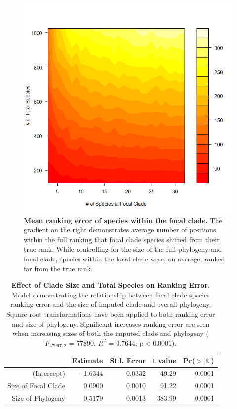 \documentclass[12pt,english]{article}
\begin{document}
\begin{figure}[!ht]
  \center
  \includegraphics[width=.5\textwidth]{rankingError.png}
  \caption{\textbf{Mean ranking error of species within the focal clade.} The 
  gradient on the right demonstrates average number of positions within the 
  full ranking that focal clade species shifted from their true rank.
  While controlling for the size of the full phylogeny and focal clade, species 
  within the focal clade were, on average, ranked far from the true rank. }
  \label{rankingError}
\end{figure}

\begin{table}[ht]
  \centering
  \begin{tabular}{rrrrr}
    \hline
   & Estimate & Std. Error & t value & Pr($>$$|$t$|$) \\
    \hline
  (Intercept) & -1.6344 & 0.0332 & -49.29 & 0.0001 \\
    Size of Focal Clade & 0.0900 & 0.0010 & 91.22 & 0.0001 \\
    Size of Phylogeny & 0.5179 & 0.0013 & 383.99 & 0.0001 \\
     \hline
     \hline
  \end{tabular}
  \caption{\textbf{Effect of Clade Size and Total Species on Ranking
  Error.} Model demonstrating the relationship between focal clade species
  ranking error and the size of imputed clade and overall phylogeny. Square-root
  transformations have been applied to both ranking error and size of phylogeny.
  Significant increases ranking error are seen when increasing sizes of both the
  imputed clade and phylogeny ($F_{47997, 2}$ = 77890, $R^{2}$ = 0.7644,
  p$<$0.0001).}
\label{impute_model}
  \end{table}

\clearpage
\end{document}
